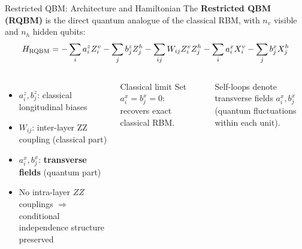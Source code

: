 \documentclass[aspectratio=169,10pt]{beamer}
\begin{document}
\begin{frame}{Restricted QBM: Architecture and Hamiltonian}
  The \textbf{Restricted QBM (RQBM)} is the direct quantum
  analogue of the classical RBM, with $n_v$ visible and
  $n_h$ hidden qubits:
  \[
    H_{\rm RQBM}
    = -\sum_i a_i^z Z_i^v - \sum_j b_j^z Z_j^h
      -\sum_{ij} W_{ij} Z_i^v Z_j^h
      -\sum_i a_i^x X_i^v - \sum_j b_j^x X_j^h
  \]

  \begin{columns}[T]
      \begin{itemize}
        \item $a_i^z, b_j^z$: classical longitudinal biases
        \item $W_{ij}$: inter-layer ZZ coupling (classical part)
        \item $a_i^x, b_j^x$: \textbf{transverse fields}
              (quantum part)
        \item No intra-layer $ZZ$ couplings $\Rightarrow$
              conditional independence structure preserved
      \end{itemize}

      \begin{alertblock}{Classical limit}
        Set $a_i^x = b_j^x = 0$: recovers exact classical RBM.
      \end{alertblock}
      \vspace{0.2cm}
      \begin{center}
      \end{center}
      {\small Self-loops denote transverse fields $a_i^x, b_j^x$
       (quantum fluctuations within each unit).}
  \end{columns}
\end{frame}
\end{document}
